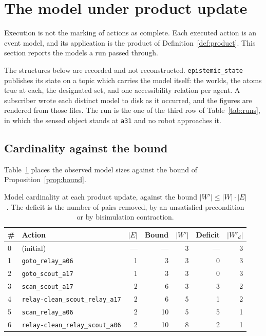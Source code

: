 \documentclass[11pt,a4paper]{article}
\theoremstyle{definition}
\newcommand{\code}[1]{\texttt{\small #1}}
\newcommand{\site}[1]{\code{#1}}
\begin{document}
\section{The model under product update}
\label{sec:updates}

Execution is not the marking of actions as complete. Each executed action is an
event model, and its application is the product of
Definition~\ref{def:product}. This section reports the models a run passed
through.

The structures below are recorded and not reconstructed.
\code{epistemic\_state} publishes its state on a topic which carries the model
itself: the worlds, the atoms true at each, the designated set, and one
accessibility relation per agent. A subscriber wrote each distinct model to
disk as it occurred, and the figures are rendered from those files. The run is
the one of the third row of Table~\ref{tab:runs}, in which the sensed object
stands at \site{a31} and no robot approaches it.

\subsection{Cardinality against the bound}

Table~\ref{tab:contraction} places the observed model sizes against the bound
of Proposition~\ref{prop:bound}.

\begin{table}[H]
\centering\small
\caption{Model cardinality at each product update, against the bound
$|W'| \le |W|\cdot|E|$. The deficit is the number of pairs removed, by an
unsatisfied precondition or by bisimulation contraction.}
\label{tab:contraction}
\begin{tabular}{@{}llrrrrr@{}}
\toprule
\textbf{\#} & \textbf{Action} & $|E|$ & \textbf{Bound} & $|W'|$
  & \textbf{Deficit} & $|W'_d|$ \\
\midrule
0 & (initial)                        & --- & --- &  3 & --- & 3 \\
1 & \code{goto\_relay\_a06}          & 1 &  3 &  3 & 0 & 3 \\
2 & \code{goto\_scout\_a17}          & 1 &  3 &  3 & 0 & 3 \\
3 & \code{scan\_scout\_a17}          & 2 &  6 &  3 & 3 & 2 \\
4 & \code{relay-clean\_scout\_relay\_a17} & 2 &  6 &  5 & 1 & 2 \\
5 & \code{scan\_relay\_a06}          & 2 & 10 &  5 & 5 & 1 \\
6 & \code{relay-clean\_relay\_scout\_a06} & 2 & 10 &  8 & 2 & 1 \\
\bottomrule
\end{tabular}
\end{table}
\end{document}
